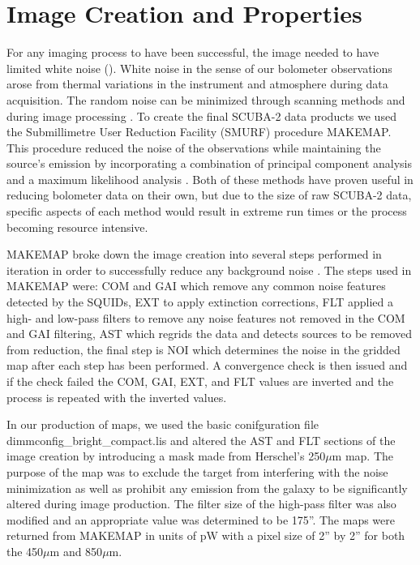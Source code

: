 \section{Image Creation and Properties}

For any imaging process to have been successful, the image needed to have limited white noise (\citet{chapin2013}).  White noise in the sense of our bolometer observations arose from thermal variations in the instrument and atmosphere during data acquisition. The random noise can be minimized through scanning methods and during image processing \citet{chapin2013}.  To create the final SCUBA-2 data products we used the Submillimetre User Reduction Facility (SMURF) procedure MAKEMAP.  This procedure reduced the noise of the observations while maintaining the source's emission by incorporating a combination of principal component analysis and a maximum likelihood analysis \citet{chapin2013}.  Both of these methods have proven useful in reducing bolometer data on their own, but due to the size of raw SCUBA-2 data, specific aspects of each method would result in extreme run times or the process becoming resource intensive.

MAKEMAP broke down the image creation into several steps performed in iteration in order to successfully reduce any background noise \citet{chapin2013}.  The steps used in MAKEMAP were:  COM and GAI which remove any common noise features detected by the SQUIDs, EXT to apply extinction corrections, FLT applied  a high- and low-pass filters to remove any noise features not removed in the COM and GAI filtering, AST which regrids the data and detects sources to be removed from reduction, the final step is NOI which determines the noise in the gridded map after each step has been performed.  A convergence check is then issued and if the check failed the COM, GAI, EXT, and FLT values are inverted and the process is repeated with the inverted values.

In our production of maps, we used the basic conifguration file dimmconfig\_bright\_compact.lis and altered the AST and FLT sections of the image creation by introducing a mask made from Herschel's 250$\mu$m map.  The purpose of the map was to exclude the target from interfering with the noise minimization as well as prohibit any emission from the galaxy to be significantly altered during image production.  The filter size of the high-pass filter was also modified and an appropriate value was determined to be 175''.  The maps were returned from MAKEMAP in units of pW with a pixel size of 2'' by 2'' for both the 450$\mu$m and 850$\mu$m.

